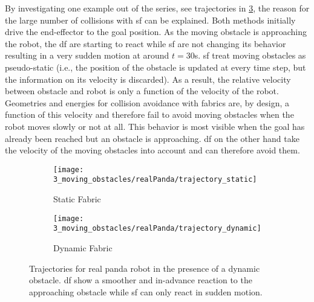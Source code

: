 By investigating one example out of the series, see trajectories in
\cref{fig:experiment3_realPanda_example}, the reason for the large number of collisions
with \ac{sf} can be explained.
Both methods initially drive
the end-effector to the goal position. As the moving obstacle is approaching the robot,
the \ac{df} are starting to react while \ac{sf} are not changing its behavior resulting
in a very sudden motion at around $t=30$s.
\ac{sf} treat moving obstacles as pseudo-static (i.e., the position of the obstacle
is updated at every time step, but the information on its velocity is discarded).  As a
result, the relative velocity between obstacle and robot is only a function of the
velocity of the robot. Geometries and energies for collision avoidance with fabrics are,
by design, a function of this velocity and therefore fail to avoid moving obstacles when
the robot moves slowly or not at all. This behavior is most visible when the goal has
already been reached but an obstacle is approaching. \ac{df} on the other hand
take the velocity of the moving obstacles into account and can therefore avoid them.
%
\begin{figure}[ht]
  \centering
  \begin{subfigure}{0.45\linewidth}
    \centering
    \texttt{[image: 3\_moving\_obstacles/realPanda/trajectory\_static]}
    \caption{Static Fabric}%
    \label{subfig:experiment3_realPanda_trajectory_static}
  \end{subfigure}%
  \begin{subfigure}{0.45\linewidth}
    \centering
    \texttt{[image: 3\_moving\_obstacles/realPanda/trajectory\_dynamic]}
    \caption{Dynamic Fabric}%
    \label{subfig:experiment3_realPanda_trajectory_dynamic}
  \end{subfigure}
  \caption{Trajectories for real panda robot in the presence of a dynamic obstacle. \ac{df}
    show a smoother and in-advance reaction to the approaching obstacle
    while \ac{sf} can only react in sudden motion.
  }%
  \label{fig:experiment3_realPanda_example}
\end{figure}


